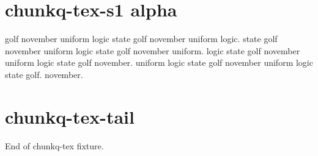 \section{chunkq-tex-s1 alpha}

golf november uniform logic state golf november uniform logic. state golf november uniform logic state golf november uniform. logic state golf november uniform logic state golf november. uniform logic state golf november uniform logic state golf. november.

\section{chunkq-tex-tail}

End of chunkq-tex fixture.
